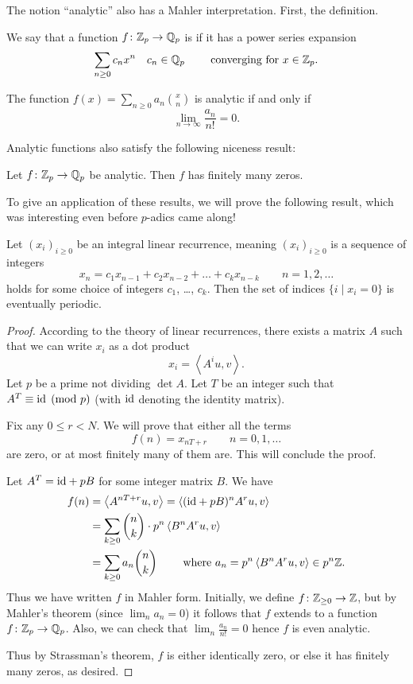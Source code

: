 The notion ``analytic'' also has a Mahler interpretation.
First, the definition.
\begin{definition}
We say that a function $f \colon \mathbb Z_p \to \mathbb Q_p$ is 
if it has a power series expansion
\[ \sum_{n \ge 0} c_n x^n \quad c_n \in \mathbb Q_p
	\qquad\text{ converging for } x \in \mathbb Z_p. \]
\end{definition}
\begin{theorem}
	The function $f(x) = \sum_{n \ge 0} a_n \binom xn$ is analytic
	if and only if
	\[ \lim_{n \to \infty} \frac{a_n}{n!} = 0. \]
\end{theorem}
Analytic functions also satisfy the following niceness result:
\begin{theorem}
	Let $f \colon \mathbb Z_p \to \mathbb Q_p$ be analytic.
	Then $f$ has finitely many zeros.
\end{theorem}

To give an application of these results,
we will prove the following result,
which was interesting even before $p$-adics came along!
\begin{theorem}
	Let $(x_i)_{i \ge 0}$ be an integral linear recurrence,
	meaning $(x_i)_{i \ge 0}$ is a sequence of integers
	\[ x_n = c_1 x_{n-1} + c_2 x_{n-2} + \dots + c_k x_{n-k}
		\qquad n = 1, 2, \dots \]
	holds for some choice of integers $c_1$, \dots, $c_k$.
	Then the set of indices $\{ i \mid x_i = 0 \}$
	is eventually periodic.
\end{theorem}

\begin{proof}
	According to the theory of linear recurrences,
	there exists a matrix $A$ such that we can write
	$x_i$ as a dot product
	\[ x_i = \left< A^i u, v \right>. \]
	Let $p$ be a prime not dividing $\det A$.
	Let $T$ be an integer such that $A^T \equiv \mathrm{id} \pmod p$
	(with $\mathrm{id}$ denoting the identity matrix).

	Fix any $0 \le r < N$.
	We will prove that either all the terms
	\[ f(n) = x_{nT+r} \qquad n = 0, 1, \dots \]
	are zero, or at most finitely many of them are.
	This will conclude the proof.

	Let $A^T = \mathrm{id} + pB$ for some integer matrix $B$.
	We have
	\begin{align*}
		f(n) &= \left< A^{nT+r} u, v \right>
		= \left< (\mathrm{id} + pB)^n A^r u, v \right> \\
		&= \sum_{k \ge 0} \binom nk \cdot p^n \left< B^n A^r u, v \right> \\
		&= \sum_{k \ge 0} a_n \binom nk \qquad \text{ where }
			a_n = p^n \left< B^n A^r u, v \right> \in p^n \mathbb Z.
	\end{align*}
	Thus we have written $f$ in Mahler form.
	Initially, we define $f \colon \mathbb Z_{\ge 0} \to \mathbb Z$,
	but by Mahler's theorem (since $\lim_n a_n = 0$)
	it follows that $f$ extends to a function $f \colon \mathbb Z_p \to \mathbb Q_p$.
	Also, we can check that $\lim_n \frac{a_n}{n!} = 0$
	hence $f$ is even analytic.

	Thus by Strassman's theorem, $f$ is either identically zero,
	or else it has finitely many zeros, as desired.
\end{proof}

